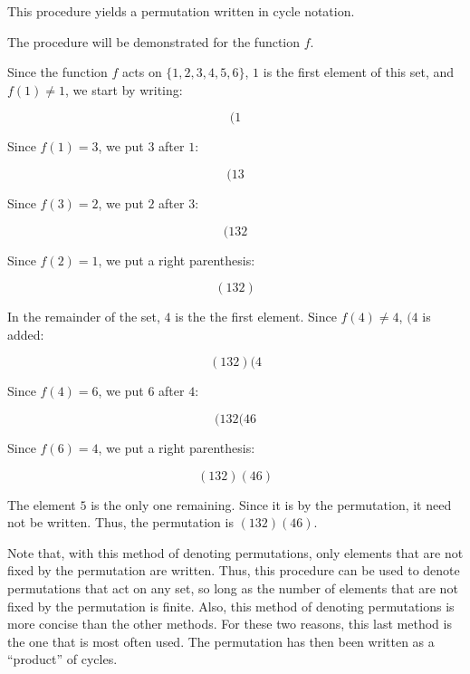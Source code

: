 \documentclass[12pt]{article}
\begin{document}
This procedure yields a permutation written in cycle notation.

The procedure will be demonstrated for the function $f$.

Since the function $f$ acts on $\{1,2,3,4,5,6\}$, $1$ is the first element of this set, and $f(1)\neq 1$, we start by writing:

$$(1$$

Since $f(1)=3$, we put $3$ after $1$:

$$(13$$

Since $f(3)=2$, we put $2$ after $3$:

$$(132$$

Since $f(2)=1$, we put a right parenthesis:

$$(132)$$

In the remainder of the set, $4$ is the the first element.  Since $f(4)\neq 4$, $(4$ is added:

$$(132)(4$$

Since $f(4)=6$, we put $6$ after $4$:

$$(132(46$$

Since $f(6)=4$, we put a right parenthesis:

$$(132)(46)$$

The element $5$ is the only one remaining.  Since it is  by the permutation, it need not be written.  Thus, the permutation is $(132)(46)$.

Note that, with this method of denoting permutations, only elements that are not fixed by the permutation are written.  Thus, this procedure can be used to denote permutations that act on any set, so long as the number of elements that are not fixed by the permutation is finite.  Also, this method of denoting permutations is more concise than the other methods.  For these two reasons, this last method is the one that is most often used.  The permutation has then been written as a ``product'' of cycles.
\end{document}
